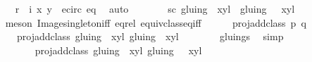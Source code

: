 \begin{isabellebody}
\ \ \ \ \ \ \isamarkupfalse%
\ {\isacartoucheopen}{\isacharparenleft}{\isasymtau}\ {\isasymcirc}\ r\ {\isasymcirc}\ i{\isacharparenright}\ {\isacharparenleft}x{\isacharcomma}\ y{\isacharparenright}\ {\isasymin}\ e{\isacharunderscore}circ{\isacartoucheclose}\ eq{\isacharparenleft}{}{\isacharparenright}\ \isamarkupfalse%
\ auto\isanewline
\ \ \ \ \isamarkupfalse%
\ \isamarkupfalse%
\ sc{\isacharcolon}\ {\isachardoublequoteopen}{\isacharparenleft}gluing\ {\isacharbackquote}{\isacharbackquote}\ {\isacharbraceleft}{\isacharparenleft}{\isacharparenleft}x{\isacharprime}{\isacharcomma}y{\isacharprime}{\isacharparenright}{\isacharcomma}l{\isacharprime}{\isacharparenright}{\isacharbraceright}{\isacharparenright}\ {\isacharequal}\ {\isacharparenleft}gluing\ {\isacharbackquote}{\isacharbackquote}\ {\isacharbraceleft}{\isacharparenleft}{\isasymtau}\ {\isacharparenleft}x{\isacharprime}{\isacharcomma}y{\isacharprime}{\isacharparenright}{\isacharcomma}l{\isacharprime}{\isacharplus}{}{\isacharparenright}{\isacharbraceright}{\isacharparenright}{\isachardoublequoteclose}\isanewline
\ \ \ \ \ \ \isamarkupfalse%
\ {\isacharparenleft}meson\ Image{\isacharunderscore}singleton{\isacharunderscore}iff\ eq{\isacharunderscore}rel\ equiv{\isacharunderscore}class{\isacharunderscore}eq{\isacharunderscore}iff{\isacharparenright}\isanewline
\ \ \ \ \isamarkupfalse%
\ {\isachardoublequoteopen}proj{\isacharunderscore}add{\isacharunderscore}class\ p\ q\ {\isacharequal}\isanewline
\ \ \ \ \ \ \ \ \ \ proj{\isacharunderscore}add{\isacharunderscore}class\ {\isacharparenleft}gluing\ {\isacharbackquote}{\isacharbackquote}\ {\isacharbraceleft}{\isacharparenleft}{\isacharparenleft}x{\isacharcomma}y{\isacharparenright}{\isacharcomma}l{\isacharparenright}{\isacharbraceright}{\isacharparenright}\ {\isacharparenleft}gluing\ {\isacharbackquote}{\isacharbackquote}\ {\isacharbraceleft}{\isacharparenleft}{\isacharparenleft}x{\isacharprime}{\isacharcomma}y{\isacharprime}{\isacharparenright}{\isacharcomma}l{\isacharprime}{\isacharparenright}{\isacharbraceright}{\isacharparenright}{\isachardoublequoteclose}\isanewline
\ \ \ \ \ \ \isamarkupfalse%
\ gluings\ \isamarkupfalse%
\ simp\isanewline
\ \ \ \ \isamarkupfalse%
\ \isamarkupfalse%
\ {\isachardoublequoteopen}{\isachardot}{\isachardot}{\isachardot}\ {\isacharequal}\ \isanewline
\ \ \ \ \ \ \ \ \ \ proj{\isacharunderscore}add{\isacharunderscore}class\ {\isacharparenleft}gluing\ {\isacharbackquote}{\isacharbackquote}\ {\isacharbraceleft}{\isacharparenleft}{\isacharparenleft}x{\isacharcomma}y{\isacharparenright}{\isacharcomma}l{\isacharparenright}{\isacharbraceright}{\isacharparenright}\ {\isacharparenleft}gluing\ {\isacharbackquote}{\isacharbackquote}\ {\isacharbraceleft}{\isacharparenleft}{\isasymtau}\ {\isacharparenleft}x{\isacharprime}{\isacharcomma}y{\isacharprime}{\isacharparenright}{\isacharcomma}l{\isacharprime}{\isacharplus}{}{\isacharparenright}{\isacharbraceright}{\isacharparenright}{\isachardoublequoteclose}\isanewline

\end{isabellebody}

